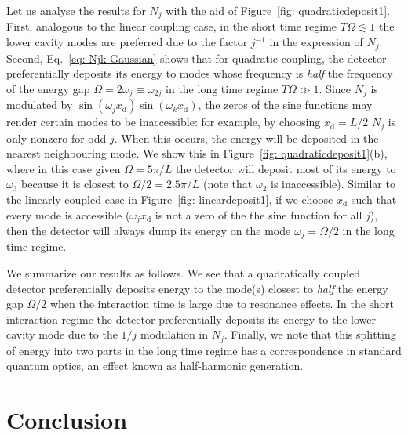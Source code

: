 \documentclass[11pt,prd,onecolumn,superscriptaddress,nofootinbib,floatfix,amsmath,amssymb]{revtex4-2}
\begin{document}
    Let us analyse the results for $N_j$ with the aid of Figure~\ref{fig: quadraticdeposit1}. First, analogous to the linear coupling case,  in the short time regime $T\Omega\lesssim 1$ the lower cavity modes are preferred due to the factor $j^{-1}$ in the expression of $N_j$. Second,  Eq.~\eqref{eq: Njk-Gaussian} shows that for quadratic coupling, the detector preferentially deposits its energy to modes whose frequency is \textit{half} the frequency of the energy gap $\Omega=2\omega_j \equiv \omega_{2j}$ in the long time regime $T\Omega\gg 1$. Since $N_j$ is modulated by $\sin(\omega_jx_\text{d})\sin(\omega_k x_\text{d})$, the zeros of the sine functions may render certain modes to be inaccessible: for example, by choosing $x_\text{d}=L/2$ $N_j$ is only nonzero for odd $j$. When this occurs, the energy will be deposited in the nearest neighbouring mode. We show this in Figure~\ref{fig: quadraticdeposit1}(b), where in this case given $\Omega = 5\pi/L$ the detector will deposit most of its energy to $\omega_3$ because it is closest to $\Omega/2 = 2.5\pi/L$ (note that $\omega_2$ is inaccessible). Similar to the linearly coupled case in Figure~\ref{fig: lineardeposit1}, if we choose $x_\text{d}$ such that every mode is accessible ($\omega_jx_{\text{d}}$ is not a zero of the the sine function for all $j$), then the detector will always dump its energy on the mode $\omega_j = \Omega/2$ in the long time regime. 
    
        
    We summarize our results as follows. We see that a quadratically coupled detector preferentially deposits energy to the mode(s) closest to \textit{half} the energy gap $\Omega/2$ when the interaction time is large due to resonance effects. In the short interaction regime the detector preferentially deposits its energy to the lower cavity mode due to the $1/j$ modulation in $N_j$. Finally, we note that this splitting of energy into two parts in the long time regime has a correspondence in standard quantum optics, an effect known as half-harmonic generation.
        
        
        
        
        

        
        
        
    

    \section{Conclusion}
    \label{sec:conclusions}
    
\end{document}

